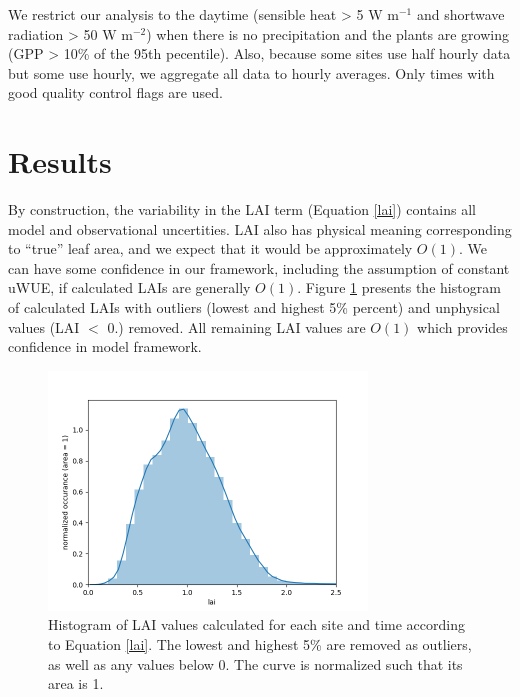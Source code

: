 \documentclass[draft,linenumbers]{agujournal}
\begin{document}
We restrict our analysis to the daytime (sensible heat > 5 W m$^{-1}$ and shortwave radiation > 50 W m$^{-2}$) when there is no precipitation and the plants are growing (GPP > 10\% of the 95th pecentile). Also, because some sites use half hourly data but some use hourly, we aggregate all data to hourly averages. Only times with good quality control flags are used.

\section{Results}

By construction, the variability in the LAI term (Equation \ref{lai}) contains all model and observational uncertities. LAI also has physical meaning corresponding to ``true'' leaf area, and we expect that it would be approximately $O(1)$. We can have some confidence in our framework, including the assumption of constant uWUE, if calculated LAIs are generally $O(1)$. Figure \ref{lai_fig} presents the histogram of calculated LAIs with outliers (lowest and highest 5\% percent) and unphysical values (LAI $<$ 0.) removed. All remaining LAI values are $O(1)$ which provides confidence in model framework.

\begin{figure}[h]
\centering
\includegraphics[width=20pc]{./fig02.png}
\caption{Histogram of LAI values calculated for each site and time according to Equation \ref{lai}. The lowest and highest 5\% are removed as outliers, as well as any values below 0. The curve is normalized such that its area is 1.}
\label{lai_fig}
\end{figure}
\end{document}

